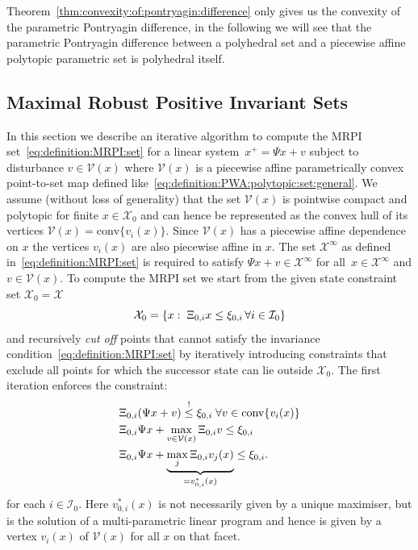 \documentclass[journal]{IEEEtran}
\providecommand{\conv}{\text{conv}}
\theoremstyle{remark}
\theoremstyle{definition}
\begin{document}
%
Theorem~\ref{thm:convexity:of:pontryagin:difference} only gives us the convexity of the parametric
Pontryagin difference, in the following we will see that the parametric Pontryagin difference between
a polyhedral set and a piecewise affine polytopic parametric set is polyhedral itself.
%
%
%
%
%
%
\subsection{Maximal Robust Positive Invariant Sets}\label{ssec:MRPI:sets}
%
In this section we describe an iterative algorithm to compute the MRPI set~\eqref{eq:definition:MRPI:set}
for a linear system~$x^+=\Psi x + v$ subject to disturbance $v\in\mathcal V(x)$ where $\mathcal V(x)$ is 
a piecewise affine parametrically convex point-to-set map defined 
like~\eqref{eq:definition:PWA:polytopic:set:general}.
%
We assume (without loss of generality) that the set $\mathcal V(x)$ is pointwise compact and polytopic 
for finite $x\in\mathcal X_0$ and can hence be represented as the 
convex hull of its vertices $\mathcal V(x) = \conv\{v_i(x)\}$. 
%
Since ${\mathcal{V}}(x)$ has a piecewise affine dependence on $x$ the vertices $v_i(x)$ are also piecewise 
affine in $x$.
%
The set $\mathcal X^\infty$ as defined in~\eqref{eq:definition:MRPI:set} is required to satisfy $\Psi x + 
v\in\mathcal X^\infty$ for all~$x\in\mathcal X^\infty$ and $v\in\mathcal V(x)$. 
%
To compute the MRPI set we start from the given state constraint set $\mathcal X_0=\mathcal X$
%
\[
\mathcal X_0 = \{x:\;\Xi_{0,i}x\leq \xi_{0,i}\,\forall i\in\mathcal I_0\}
\]
%
and recursively \emph{cut off} points that cannot satisfy the invariance condition~\eqref{eq:definition:MRPI:set}
by iteratively introducing constraints that exclude all points for which the successor state can lie outside 
$\mathcal X_0$. 
%
The first iteration enforces the constraint:
%
\[
\begin{split}
  &\genmat_{0,i}(\Psi x + v)\overset{!}{\leq}\genvec_{0,i}\;\forall v\in\conv\{v_i(x)\}\\
  &\genmat_{0,i}\Psi x + \max_{v\in\mathcal V(x)} \genmat_{0,i} v \leq \genvec_{0,i}\\
  &\genmat_{0,i}\Psi x + \underbrace{\max_{j} \genmat_{0,i} v_j(x)}_{=v_{0,i}^\ast(x)} \leq \genvec_{0,i}.
\end{split}
\]
%
for each $i\in \mathcal I_0$.
%
Here $v_{0,i}^\ast(x)$ is not necessarily given by a unique maximiser, but is the solution of a multi-parametric 
linear program and hence is given by a vertex $v_i(x)$ of $\mathcal V(x)$ for all $x$ on that facet.
\end{document}
